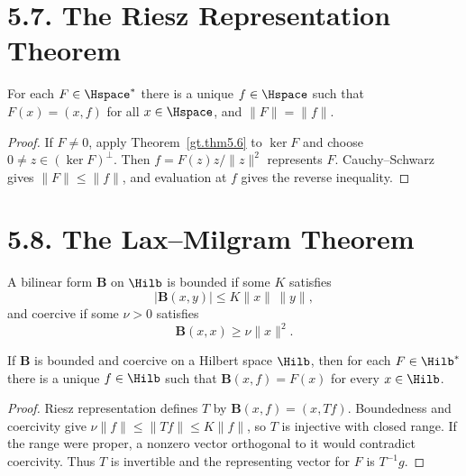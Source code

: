 \section*{5.7. The Riesz Representation Theorem}

\begin{theorem}\label{gt.thm5.7}
For each $F\in\Hspace^*$ there is a unique $f\in\Hspace$ such that
$F(x)=(x,f)$ for all $x\in\Hspace$, and $\|F\|=\|f\|$.
\end{theorem}
\begin{proof}
\sketch If $F\neq0$, apply Theorem~\ref{gt.thm5.6} to $\ker F$ and choose
$0\neq z\in(\ker F)^\perp$. Then
$f=F(z)z/\|z\|^2$ represents $F$. Cauchy--Schwarz gives
$\|F\|\leq\|f\|$, and evaluation at $f$ gives the reverse inequality.
\end{proof}

\section*{5.8. The Lax--Milgram Theorem}

\begin{definition}\label{gt.def5.8.bilinear}
A bilinear form $\mathbf B$ on $\Hilb$ is bounded if some $K$ satisfies
\begin{equation}\label{gt.eq5.10}
|\mathbf B(x,y)|\leq K\|x\|\,\|y\|,
\end{equation}
and coercive if some $\nu>0$ satisfies
\begin{equation}\label{gt.eq5.11}
\mathbf B(x,x)\geq\nu\|x\|^2.
\end{equation}
\end{definition}

\begin{theorem}\label{gt.thm5.8}
If $\mathbf B$ is bounded and coercive on a Hilbert space $\Hilb$, then for
each $F\in\Hilb^*$ there is a unique $f\in\Hilb$ such that
$\mathbf B(x,f)=F(x)$ for every $x\in\Hilb$.
\end{theorem}
\begin{proof}
\sketch Riesz representation defines $T$ by
$\mathbf B(x,f)=(x,Tf)$. Boundedness and coercivity give
$\nu\|f\|\leq\|Tf\|\leq K\|f\|$, so $T$ is injective with closed range.
If the range were proper, a nonzero vector orthogonal to it would contradict
coercivity. Thus $T$ is invertible and the representing vector for $F$ is
$T^{-1}g$.
\end{proof}

